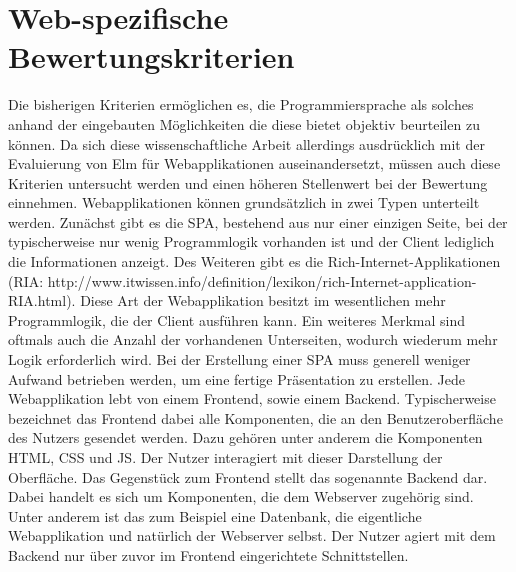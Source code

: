 \section{Web-spezifische Bewertungskriterien}
\label{sec:muster_web}
Die bisherigen Kriterien ermöglichen es, die Programmiersprache als solches anhand der eingebauten Möglichkeiten die diese bietet objektiv beurteilen zu können. Da sich diese wissenschaftliche Arbeit allerdings ausdrücklich mit der Evaluierung von Elm für Webapplikationen auseinandersetzt, müssen auch diese Kriterien untersucht werden und einen höheren Stellenwert bei der Bewertung einnehmen.
Webapplikationen können grundsätzlich in zwei Typen unterteilt werden. Zunächst gibt es die \ac{SPA}, bestehend aus nur einer einzigen Seite, bei der typischerweise nur wenig  Programmlogik vorhanden ist und der Client lediglich die Informationen anzeigt. Des Weiteren gibt es die Rich-Internet-Applikationen\\
(RIA: http://www.itwissen.info/definition/lexikon/rich-Internet-application-RIA.html). Diese Art der Webapplikation besitzt im wesentlichen mehr Programmlogik, die der Client ausführen kann. Ein weiteres Merkmal sind oftmals auch die Anzahl der vorhandenen Unterseiten, wodurch wiederum mehr Logik erforderlich wird.
Bei der Erstellung einer \ac{SPA} muss generell weniger Aufwand betrieben werden, um eine fertige Präsentation zu erstellen.
Jede Webapplikation lebt von einem Frontend, sowie einem Backend. Typischerweise bezeichnet das Frontend dabei alle Komponenten, die an den Benutzeroberfläche des Nutzers gesendet werden. Dazu gehören unter anderem die Komponenten \ac{HTML}, \ac{CSS} und \ac{JS}. Der Nutzer interagiert mit dieser Darstellung der Oberfläche.
Das Gegenstück zum Frontend stellt das sogenannte Backend dar. Dabei handelt es sich um Komponenten, die dem Webserver zugehörig sind. Unter anderem ist das zum Beispiel eine Datenbank, die eigentliche Webapplikation und natürlich der Webserver selbst. Der Nutzer agiert mit dem Backend nur über zuvor im Frontend eingerichtete Schnittstellen.


